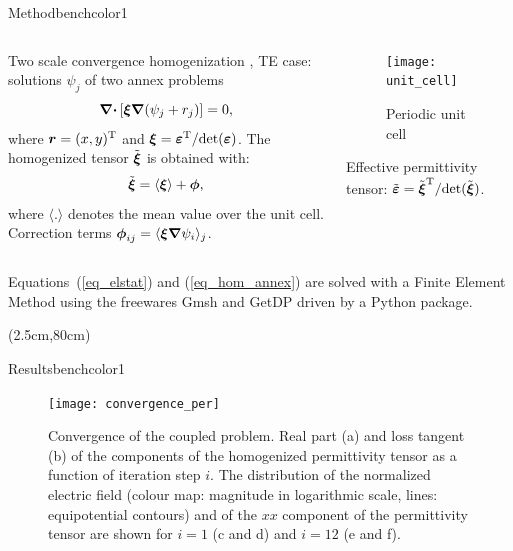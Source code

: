 \documentclass[final,12pt]{beamer} %
\begin{document}
\begin{frame}
\begin{textblock*}{38.5cm}
\begin{posterblock}{Method}{benchcolor1}
\begin{columns}[t,totalwidth=\columnwidth]
\begin{column}{.64\columnwidth}
  Two scale convergence homogenization \cite{allaire_homogenization_1992, guenneau_homogenization_2000}, TE case:
  solutions $\psi_j$ of two annex problems
  \begin{equation}
   \boldsymbol{\mathrm{\nabla\cdotp}} \left[ \boldsymbol{\xi} \boldsymbol{\mathrm{\nabla}}(\psi_j + r_j) \right] = 0,
   \label{eq_hom_annex}
  \end{equation}
  where $\boldsymbol r = (x, y)^{\rm T}$ and $\boldsymbol{\xi}=\boldsymbol{\varepsilon}^{\rm T}/ {\rm det }(\boldsymbol{\varepsilon})$.
  The homogenized tensor $\tilde{\boldsymbol{\xi}}$ is obtained with:
  \begin{equation}
   \tilde{\boldsymbol{\xi}} = \langle \boldsymbol{\xi} \rangle + \boldsymbol \phi,
   \label{eq_hom}
  \end{equation}
  where $\langle . \rangle$ denotes the mean value over the unit cell.
  Correction terms $\boldsymbol \phi_{ij} = \langle \boldsymbol{\xi} \boldsymbol{\mathrm{\nabla}} \psi_i \rangle_j$.\\
\end{column}

\begin{column}{.3\columnwidth}

  \begin{figure}[!t]
   \centering
   \texttt{[image: unit\_cell]}
   \caption{Periodic unit cell}
   \label{fig_cell}
  \end{figure}

  Effective permittivity tensor: $\tilde{\boldsymbol{\varepsilon}}=\tilde{\boldsymbol{\xi}}^{\rm T}/ {\rm det }(\tilde{\boldsymbol{\xi}})$.



\end{column}
\end{columns}




Equations~(\ref{eq_elstat}) and (\ref{eq_hom_annex}) are solved with a Finite Element
Method using the freewares Gmsh \cite{geuzaine_gmsh:_2009} and GetDP \cite{dular_general_1998} driven by a Python package.

\end{posterblock}
\end{textblock*}
%
%
\begin{textblock*}{38.5cm}(2.5cm,80cm)
\begin{posterblock}{Results}{benchcolor1}
 \begin{figure}[!t]
   \centering
   \texttt{[image: convergence\_per]}
   \caption{Convergence of the coupled problem.
    Real part (a) and loss tangent (b) of the components of the homogenized
    permittivity tensor as a function of iteration step $i$. The distribution of
    the normalized electric field (colour map: magnitude in logarithmic scale,
    lines: equipotential contours) and of the
    $xx$ component of the permittivity tensor are shown for $i=1$
    (c and d) and $i=12$ (e and f).
   }
   \label{conv2D}
 \end{figure}
\end{posterblock}


\end{textblock*}
\end{frame}
\end{document}
